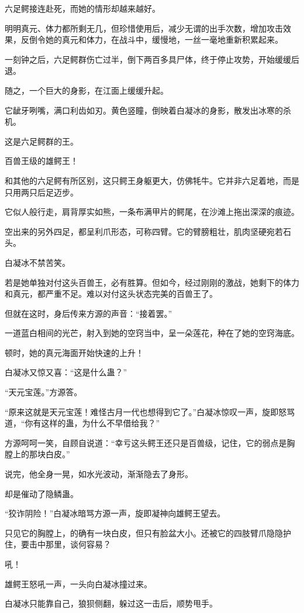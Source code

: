 \begin{this_body}
六足鳄接连赴死，而她的情形却越来越好。

明明真元、体力都所剩无几，但珍惜使用后，减少无谓的出手次数，增加攻击效果，反倒令她的真元和体力，在战斗中，缓慢地，一丝一毫地重新积累起来。

一刻钟之后，六足鳄群伤亡过半，倒下两百多具尸体，终于停止攻势，开始缓缓后退。

随之，一个巨大的身影，在江面上缓缓升起。

它龇牙咧嘴，满口利齿如刃。黄色竖瞳，倒映着白凝冰的身影，散发出冰寒的杀机。

这是六足鳄群的王。

百兽王级的雄鳄王！

和其他的六足鳄有所区别，这只鳄王身躯更大，仿佛牦牛。它并非六足着地，而是只用两只后足迈步。

它似人般行走，肩背厚实如熊，一条布满甲片的鳄尾，在沙滩上拖出深深的痕迹。

空出来的另外四足，都呈利爪形态，可称四臂。它的臂膀粗壮，肌肉坚硬宛若石头。

白凝冰不禁苦笑。

若是她单独对付这头百兽王，必有胜算。但如今，经过刚刚的激战，她剩下的体力和真元，都严重不足。难以对付这头状态完美的百兽王了。

但就在这时，身后传来方源的声音：“接着罢。”

一道蓝白相间的光芒，射入到她的空窍当中，呈一朵莲花，种在了她的空窍海底。

顿时，她的真元海面开始快速的上升！

白凝冰又惊又喜：“这是什么蛊？”

“天元宝莲。”方源答。

“原来这就是天元宝莲！难怪古月一代也想得到它了。”白凝冰惊叹一声，旋即怒骂道，“你有这样的蛊，为什么不早借给我？”

方源呵呵一笑，自顾自说道：“幸亏这头鳄王还只是百兽级，记住，它的弱点是胸膛上的那块白皮。”

说完，他全身一晃，如水光波动，渐渐隐去了身形。

却是催动了隐鳞蛊。

“狡诈阴险！”白凝冰暗骂方源一声，旋即凝神向雄鳄王望去。

只见它的胸膛上，的确有一块白皮，但只有脸盆大小。还被它的四肢臂爪隐隐护住，要击中那里，谈何容易？

吼！

雄鳄王怒吼一声，一头向白凝冰撞过来。

白凝冰只能靠自己，狼狈侧翻，躲过这一击后，顺势甩手。


\end{this_body}
